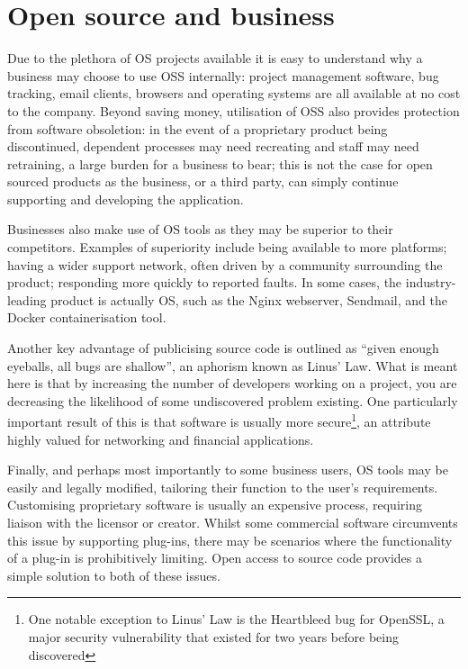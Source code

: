 \documentclass[a4paper]{article}
\begin{document}
\section{Open source and business}

Due to the plethora of OS projects available it is easy to understand why a business may choose to use OSS internally: project management software, bug tracking, email clients, browsers and operating systems are all available at no cost to the company. Beyond saving money, utilisation of OSS also provides protection from software obsoletion: in the event of a proprietary product being discontinued, dependent processes may need recreating and staff may need retraining, a large burden for a business to bear; this is not the case for open sourced products as the business, or a third party, can simply continue supporting and developing the application.

Businesses also make use of OS tools as they may be superior to their competitors. Examples of superiority include being available to more platforms; having a wider support network, often driven by a community surrounding the product; responding more quickly to reported faults\cite{cio}. In some cases, the industry-leading product is actually OS, such as the Nginx webserver\cite{nginx}, Sendmail\cite{sendmail}, and the Docker containerisation tool\cite{docker}.

Another key advantage of publicising source code is outlined as “given enough eyeballs, all bugs are shallow”, an aphorism known as Linus’ Law\cite{catb}. What is meant here is that by increasing the number of developers working on a project, you are decreasing the likelihood of some undiscovered problem existing. One particularly important result of this is that software is usually more secure\footnote{One notable exception to Linus’ Law is the Heartbleed bug for OpenSSL, a major security vulnerability that existed for two years before being discovered\cite{heartbleed}}, an attribute highly valued for networking and financial applications\cite{secureoss}.

Finally, and perhaps most importantly to some business users, OS tools may be easily and legally modified, tailoring their function to the user’s requirements. Customising proprietary software is usually an expensive process, requiring liaison with the licensor or creator. Whilst some commercial software circumvents this issue by supporting plug-ins, there may be scenarios where the functionality of a plug-in is prohibitively limiting. Open access to source code provides a simple solution to both of these issues.
\end{document}
